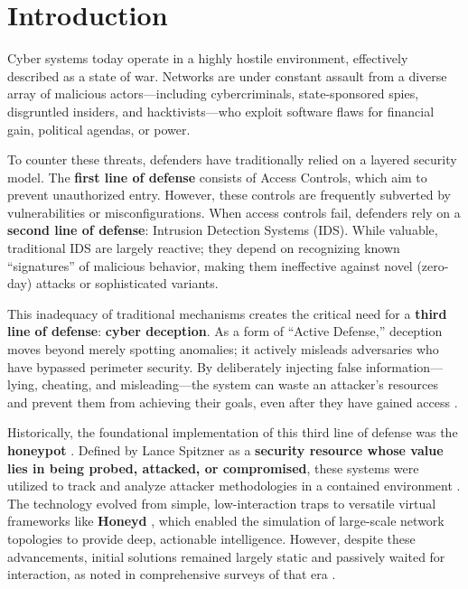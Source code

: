 \section{Introduction}

Cyber systems today operate in a highly hostile environment, effectively described as
a state of war. Networks are under constant assault from a diverse array of malicious
actors---including cybercriminals, state-sponsored spies, disgruntled insiders, and
hacktivists---who exploit software flaws for financial gain, political agendas, or power.

To counter these threats, defenders have traditionally relied on a layered security
model. The \textbf{first line of defense} consists of Access Controls, which aim to
prevent unauthorized entry. However, these controls are frequently subverted by
vulnerabilities or misconfigurations. When access controls fail, defenders rely on
a \textbf{second line of defense}: Intrusion Detection Systems (IDS). While valuable,
traditional IDS are largely reactive; they depend on recognizing known ``signatures''
of malicious behavior, making them ineffective against novel (zero-day) attacks or
sophisticated variants.

This inadequacy of traditional mechanisms creates the critical need for a
\textbf{third line of defense}: \textbf{cyber deception}. As a form of ``Active
Defense,'' deception moves beyond merely spotting anomalies; it actively misleads
adversaries who have bypassed perimeter security. By deliberately injecting false
information---lying, cheating, and misleading---the system can waste an attacker's
resources and prevent them from achieving their goals, even after they have gained
access \cite{rowe2016introduction}.

Historically, the foundational implementation of this third line of defense was the
\textbf{honeypot} \cite{cohen2006use}. Defined by Lance Spitzner as a
\textbf{security resource whose value lies in being probed, attacked, or compromised},
these systems were utilized to track and analyze attacker methodologies in a contained
environment \cite{spitzner2002honeypots}. The technology evolved from simple,
low-interaction traps to versatile virtual frameworks like \textbf{Honeyd}
\cite{provos2004virtual}, which enabled the simulation of large-scale network
topologies to provide deep, actionable intelligence. However, despite these
advancements, initial solutions remained largely static and passively waited for
interaction, as noted in comprehensive surveys of that era \cite{nawrocki2016survey}.

